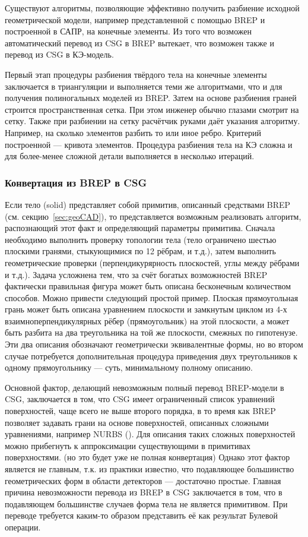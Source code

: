 Существуют алгоритмы, позволяющие эффективно получить разбиение исходной геометрической модели, например представленной с помощью BREP и построенной в САПР, на конечные элементы. Из того что возможен автоматический перевод из CSG в BREP вытекает, что возможен также и перевод из CSG в КЭ-модель.

Первый этап процедуры разбиения твёрдого тела на конечные элементы заключается в триангуляции и выполняется теми же алгоритмами, что и для получения полиногальных моделей из BREP. Затем на основе разбиения граней строится пространственная сетка.
При этом инженер обычно глазами смотрит на сетку. Также при разбиении на сетку расчётчик руками даёт указания алгоритму. Например, на сколько элементов разбить то или иное ребро. Критерий построенной --- кривота элементов. Процедура разбиения тела на КЭ сложна и для более-менее сложной детали выполняется в несколько итераций. 

\subsubsection{Конвертация из BREP в CSG}\label{sec:secBREPtoCSG}

Если тело (solid) представляет собой примитив, описанный средствами BREP (см. секцию~\ref{sec:geoCAD}), то представляется возможным реализовать алгоритм, распознающий этот факт и определяющий параметры примитива. Сначала необходимо выполнить проверку топологии тела (тело ограничено шестью плоскими гранями, стыкующимися по 12 рёбрам, и т.д.), затем выполнить геометрические проверки (перпендикурярность плоскостей, углы между рёбрами и т.д.). Задача усложнена тем, что за счёт богатых возможностей BREP фактически правильная фигура может быть описана бесконечным количеством способов. Можно привести следующий простой пример. Плоская прямоугольная грань может быть описана уравнением плоскости и замкнутым циклом из 4-х взаимноперпендикулярных рёбер (прямоугольник) на этой плоскости, а может быть разбита на два треугольника на той же плоскости, смежных по гипотенузе. Эти два описания обозначают геометрически эквивалентные формы, но во втором случае потребуется дополнительная процедура приведения двух треугольников к одному прямоугольнику --- суть, минимальному полному описанию.

Основной фактор, делающий невозможным полный перевод BREP-модели в CSG, заключается в том, что CSG имеет ограниченный список уравнений поверхностей, чаще всего не выше второго порядка, в то время как BREP позволяет задавать грани на основе поверхностей, описанных сложными уравнениями, например NURBS (\cite{NURBS}). Для описания таких сложных поверхностей можно прибегнуть к аппроксимации существующими в примитивах поверхностями. (\todo но это будет уже не полная конвертация)
Однако этот фактор является не главным, т.к. из практики известно, что подавляющее большинство геометрических форм в области детекторов --- достаточно простые.
Главная причина невозможности перевода из BREP в CSG заключается в том, что в подавляющем большинстве случаев форма тела не является примитивом. При переводе требуется каким-то образом представить её как результат Булевой операции.

